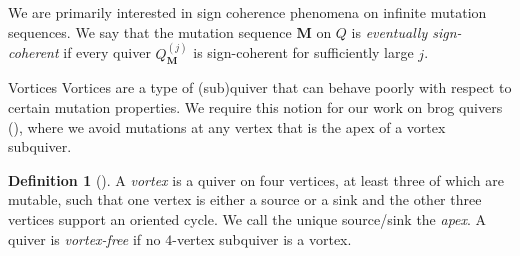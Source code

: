 \documentclass[12pt]{amsart}
\makeatletter
\theoremstyle{definition}
\newtheorem{defn}[thm]{Definition}
\theoremstyle{remark}
\numberwithin{equation}{section}
\def\subsection{\@startsection{subsection}{3}%
  \z@{.5\linespacing\@plus.7\linespacing}{.1\linespacing}%
  {\bfseries}}
\makeatother
\begin{document}
We are primarily interested in sign coherence phenomena on infinite mutation sequences.  We say that the mutation sequence $\mathbf M$ on $Q$ is \emph{eventually sign-coherent} if every quiver $Q_{\mathbf M}^{(j)}$ is sign-coherent for sufficiently large $j$.




\subsection{Vortices}
Vortices are a type of (sub)quiver that can behave poorly with respect to certain mutation properties.  We require this notion for our work on brog quivers (), where we avoid mutations at any vertex that is the apex of a vortex subquiver.  

\begin{defn}[{\cite[Definition~6.2]{LMC}}]
\label{def:vortex}
A \emph{vortex} is a quiver on four vertices, at least three of which are mutable, such that one vertex is either a source or a sink and the other three vertices support an oriented cycle. 
We call the unique source/sink the \emph{apex}.
A quiver is \emph{vortex-free} if no $4$-vertex subquiver is a vortex. 
\end{defn}
\end{document}
